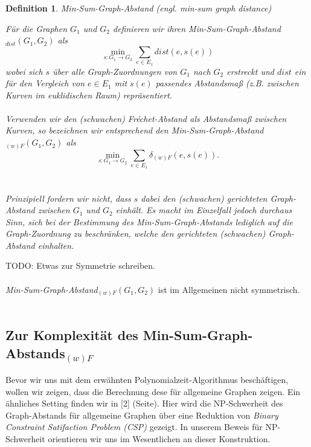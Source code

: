 \documentclass[a4paper, 12pt, twoside]{article}
\theoremstyle{Format1} %
\newtheorem{Def}{Definition}[section]       %
\begin{document}
\begin{Def}
	Min-Sum-Graph-Abstand (engl. min-sum graph distance)

	Für die Graphen $G_1$ und $G_2$ definieren wir ihren \textit{Min-Sum-Graph-Abstand}$_{dist}(G_1, G_2)$ als
	$$\min_{s: G_1 \to G_2} \sum_{e \in E_1} dist(e, s(e))$$
	wobei sich $s$ über alle Graph-Zuordnungen von $G_1$ nach $G_2$ erstreckt und $dist$ ein für den Vergleich von $e \in E_1$ mit $s(e)$
	passendes Abstandsmaß (z.B. zwischen Kurven im euklidischen Raum) repräsentiert.
	\\
	\\
	Verwenden wir den (schwachen) Fréchet-Abstand als Abstandsmaß zwischen Kurven, so bezeichnen wir entsprechend den \textit{Min-Sum-Graph-Abstand}$_{(w)F}(G_1, G_2)$ als
	$$\min_{s: G_1 \to G_2} \sum_{e \in E_1} \delta_{(w)F}(e, s(e)).$$
	\\
	\\
	Prinzipiell fordern wir nicht, dass $s$ dabei den (schwachen) gerichteten Graph-Abstand zwischen $G_1$ und $G_2$ einhält.
	Es macht im Einzelfall jedoch durchaus Sinn, sich bei der Bestimmung des \textit{Min-Sum-Graph-Abstands} lediglich auf die Graph-Zuordnung zu beschränken,
	welche den gerichteten (schwachen) Graph-Abstand einhalten.
\end{Def}

TODO: Etwas zur Symmetrie schreiben.
\\
\\
\textit{Min-Sum-Graph-Abstand}$_{(w)F}(G_1, G_2)$ ist im Allgemeinen nicht symmetrisch.
\\
\\
\subsection{Zur Komplexität des Min-Sum-Graph-Abstands$_{(w)F}$}

Bevor wir uns mit dem erwähnten Polynomialzeit-Algorithmus beschäftigen, wollen wir zeigen, dass die Berechnung dese für allgemeine Graphen zeigen.
Ein ähnliches Setting finden wir in [2] (Seite). Hier wird die NP-Schwerheit des Graph-Abstands für allgemeine Graphen über eine Reduktion von
\textit{Binary Constraint Satifaction Problem (CSP)} gezeigt. In unserem Beweis für NP-Schwerheit orientieren wir uns im Wesentlichen an dieser Konstruktion.
\end{document}
